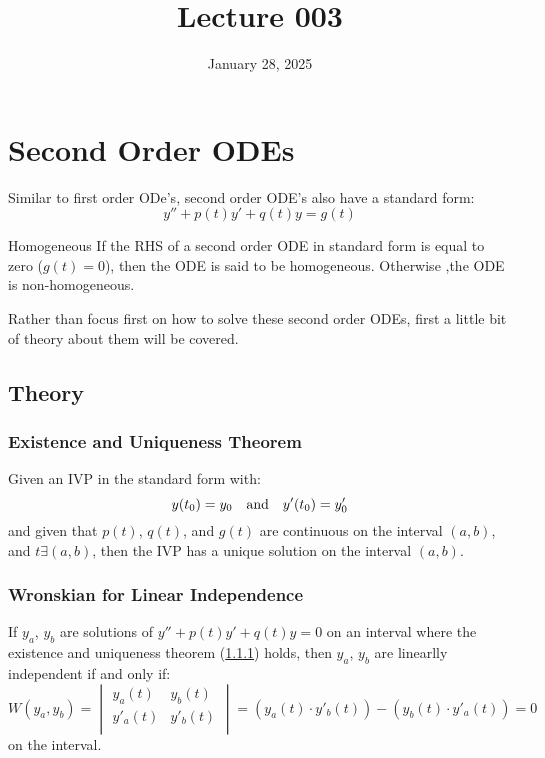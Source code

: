 \documentclass[12pt]{article}
\title{Lecture 003}
\date{January 28, 2025}
\begin{document}
\newpage
\section{Second Order ODEs}
\label{sec:secondOrderODEs}

Similar to first order ODe's, second order ODE's also have a standard form:
\begin{equation*}
  y'' + p(t)y' + q(t)y = g(t)
\end{equation*}

\begin{definition}{Homogeneous}
  If the RHS of a second order ODE in standard form is equal to zero ($g(t) = 0$), then the  ODE is said to be homogeneous. Otherwise ,the ODE is non-homogeneous.
\end{definition}

Rather than focus first on how to solve these second order ODEs, first a little bit of theory about them will be covered.

\subsection{Theory}
\label{ssec:theory}

\subsubsection{Existence and Uniqueness Theorem}
\label{sssec:existenceAndUniquenessTheorem}

Given an IVP in the standard form with:
\begin{equation*}
  y(t_0) = y_0\ \ \ \textup{and}\ \ \ y'(t_0) = y'_0
\end{equation*}
and given that $p(t)$, $q(t)$, and $g(t)$ are continuous on the interval $(a,b)$, and $t \exists (a,b)$, then the IVP has a unique solution on the interval $(a,b)$.

\subsubsection{Wronskian for Linear Independence}
\label{sssec:wronskianForLinearIndependence}

If $y_a$, $y_b$ are solutions of $y'' + p(t)y' + q(t)y = 0$ on an interval where the existence and uniqueness theorem (\ref{sssec:existenceAndUniquenessTheorem}) holds, then $y_a$, $y_b$ are linearlly independent if and only if:
\begin{equation*}
  W(y_a,y_b) = 
  \begin{vmatrix}
    y_a(t)  & y_b(t) \\
    y'_a(t) & y'_b(t) \\
  \end{vmatrix} = 
    \left( y_a(t) \cdot y'_b(t) \right) - \left( y_b(t) \cdot y'_a(t) \right) = 0
\end{equation*}
on the interval.
\end{document}
